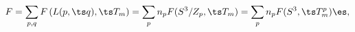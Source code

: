 \begin{equation}
F = \displaystyle \sum_{p,q} F \left( L(p,\ts q),\ts T_m \right) =
\sum_p n_p F (S^3 / Z_p,\ts T_m) = \sum_p n_p F(S^3,\ts T^p _m) \es, 
\label{eq:cntrbtnMfd}
\end{equation}

